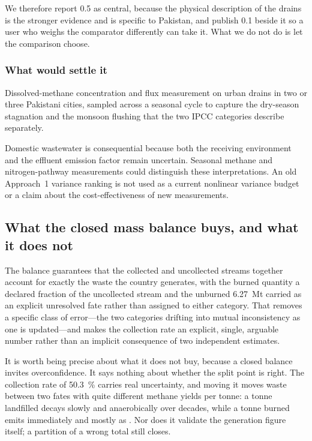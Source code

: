 We therefore report \num{0.5} as central, because the physical description of the drains is
the stronger evidence and is specific to Pakistan, and publish \num{0.1} beside it so a user
who weighs the comparator differently can take it. What we do not do is let the comparison
choose.

\subsubsection{What would settle it}

Dissolved-methane concentration and flux measurement on urban drains in two or three Pakistani
cities, sampled across a seasonal cycle to capture the dry-season stagnation and the monsoon
flushing that the two IPCC categories describe separately.

Domestic wastewater is consequential because both the receiving environment and the effluent emission factor remain uncertain. Seasonal methane and nitrogen-pathway measurements could distinguish these interpretations. An old Approach~1 variance ranking is not used as a current nonlinear variance budget or a claim about the cost-effectiveness of new measurements.

\subsection{What the closed mass balance buys, and what it does not}

The balance guarantees that the collected and uncollected streams together account for
exactly the waste the country generates, with the burned quantity a declared fraction of the
uncollected stream and the unburned \SI{6.27}{\mega\tonne} carried as an explicit unresolved
fate rather than assigned to either category. That removes a specific class of error---the two
categories drifting into mutual inconsistency as one is updated---and makes the collection rate
an explicit, single, arguable number rather than an implicit consequence of two independent
estimates.

It is worth being precise about what it does not buy, because a closed balance invites
overconfidence. It says nothing about whether the split point is right. The collection rate of
\SI{50.3}{\percent} carries real uncertainty, and moving it moves waste between two fates with
quite different methane yields per tonne: a tonne landfilled decays slowly and anaerobically
over decades, while a tonne burned emits immediately and mostly as \COtwo{}. Nor does it
validate the generation figure itself; a partition of a wrong total still closes.

